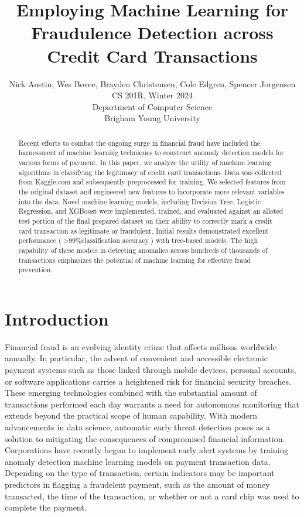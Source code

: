 \documentclass{article}
\title{Employing Machine Learning for Fraudulence Detection across Credit Card Transactions}
\author{Nick Austin, Wes Bovee, Brayden Christensen, Cole Edgren, Spencer Jorgensen\\
CS 201R, Winter 2024\\
Department of Computer Science\\
Brigham Young University \\}
\begin{document}
\maketitle

\begin{abstract}
Recent efforts to combat the ongoing surge in financial fraud have included the harnessment of machine learning techniques to construct anomaly detection models for various forms of payment.
In this paper, we analyze the utility of machine learning algorithms in classifying the legitimacy of credit card transactions. Data was collected from Kaggle.com and subsequently preprocessed for training.
We selected features from the original dataset and engineered new features to incorporate more relevant variables into the data. Novel machine learning models, including Decision Tree, Logistic Regression, and XGBoost 
were implemented, trained, and evaluated against an alloted test portion of the final prepared dataset on their ability to correctly mark a credit card transaction as legitimate or fraudulent. Initial results demonstrated excellent performance 
(\(> \text{99\% classification accuracy}\)) with tree-based models. The high capability of these models in detecting anomalies across hundreds of thousands of transactions emphasizes the potential of machine learning for effective fraud prevention.
\end{abstract}

\section{Introduction}
Financial fraud is an evolving identity crime that affects millions worldwide annually.
In particular, the advent of convenient and accessible electronic payment systems such as those linked through mobile devices,
personal accounts, or software applications carries a heightened risk for financial security breaches. These emerging technologies combined with the substantial amount of transactions performed each day warrants a need for autonomous monitoring that extends beyond the practical scope of human capability. With modern advancements in data science, automatic early threat detection poses as a solution to mitigating the consequences of compromised financial information. Corporations have recently begun to implement early alert systems by training anomaly detection machine learning models on payment transaction data. Depending on the type of transaction, certain indicators may be important predictors in flagging a fraudelent payment, such as the amount of money transacted, the time of the transaction, or whether or not a card chip was used to complete the payment. 
\end{document}
